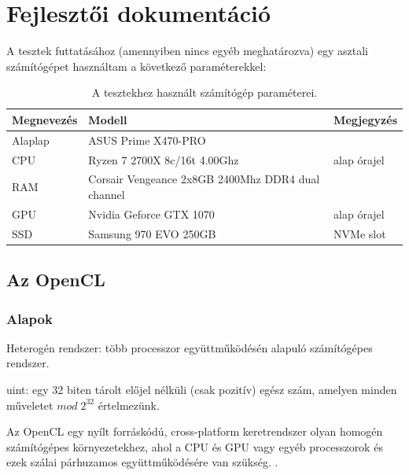 \chapter{Fejlesztői dokumentáció} %
\label{ch:impl}

A tesztek futtatásához (amennyiben nincs egyéb meghatározva) egy asztali számítógépet használtam a következő paraméterekkel:

\begin{table}[h]
\centering
    \begin{tabular}{|l|l|l|}
        \hline
        \textbf{Megnevezés} & \textbf{Modell} & \textbf{Megjegyzés} \\
        \hline
        Alaplap & ASUS Prime X470-PRO & \\
        \hline
        CPU & Ryzen 7 2700X 8c/16t 4.00Ghz & alap órajel \\
        \hline
        RAM & Corsair Vengeance 2x8GB 2400Mhz DDR4 dual channel & \\
        \hline
        GPU & Nvidia Geforce GTX 1070 & alap órajel \\
        \hline
        SSD & Samsung 970 EVO 250GB & NVMe slot \\
        \hline
    \end{tabular}
    \caption{A tesztekhez használt számítógép paraméterei.}
\end{table}


\section{Az OpenCL}



\subsection{Alapok}


\begin{definition}
Heterogén rendszer: több processzor együttműködésén alapuló számítógépes rendszer.
\end{definition}

\begin{definition}
uint: egy 32 biten tárolt előjel nélküli (csak pozitív) egész szám, amelyen minden műveletet $mod \; 2^{32}$ értelmezünk.
\end{definition}


Az OpenCL egy nyílt forráskódú, cross-platform keretrendszer olyan homogén számítógépes környezetekhez, ahol a CPU és GPU vagy egyéb processzorok és ezek szálai párhuzamos együttműködésére van szükség. \cite{munshi2011opencl}.



